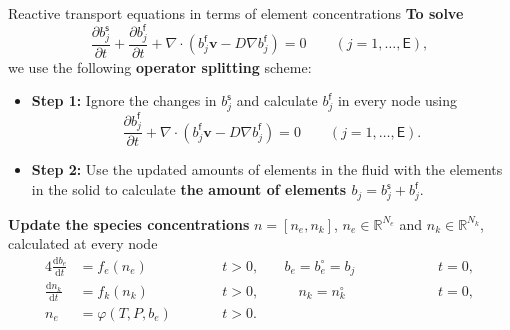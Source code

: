 \begin{frame}{Reactive transport equations in terms of element concentrations}
	\small 
\alert{\bf To solve} \\[-10pt]
\[
\frac{\partial b_{j}^{\mathsf{s}}}{\partial t}+\frac{\partial b_{j}^{\mathsf{f}}}{\partial t}+\nabla\cdot(b_{j}^{\mathsf{f}}\boldsymbol{v}-D\nabla b_{j}^{\mathsf{f}})=0\qquad(j=1,\ldots,\mathsf{E}),
\]
we use the following \alert{\bf operator splitting} scheme: 
\small
\begin{itemize}
	\item \textbf{Step 1:} Ignore the changes in $b_{j}^{\mathsf{s}}$ and
	calculate $b_{j}^{\mathsf{f}}$ in every node using
	\[
	\frac{\partial b_{j}^{\mathsf{f}}}{\partial t}+\nabla\cdot(b_{j}^{\mathsf{f}}\boldsymbol{v}-D\nabla b_{j}^{\mathsf{f}})=0\qquad(j=1,\ldots,\mathsf{E}).
	\]
	\item \textbf{Step 2: }Use the updated amounts of elements in the fluid
	with the elements in the solid to calculate {\bf the amount of elements $b_{j}=b_{j}^{\mathsf{s}}+b_{j}^{\mathsf{f}}.$}
\end{itemize}
%
\pause
\vskip 5pt
\alert{\bf Update the species concentrations} $n=[n_{e}, n_k]$, $n_e \in \mathbb{R}^{N_e}$ and $n_k \in \mathbb{R}^{N_k}$, calculated at every node %
%
\begin{alignat*}{4}
	\frac{\mathrm{d}b_{e}}{\mathrm{d}t} & = f_e(n_e)& \qquad & t>0, & \quad  b_{e}=b^{\circ}_{e} = b_{j} & \qquad & t=0,\label{eq:full-kinetics}\\[-5pt]
	\frac{\mathrm{d}n_{k}}{\mathrm{d}t} & = f_k(n_k) &  & t>0, & \quad \quad  n_{k}=n_{k}^{\circ} \quad \quad \quad &  & t=0,\nonumber \\[-5pt]
	n_{e} & =\varphi(T,P,b_{e}) &  & t>0. & &  &\nonumber 
\end{alignat*}
\end{frame}
%
%
